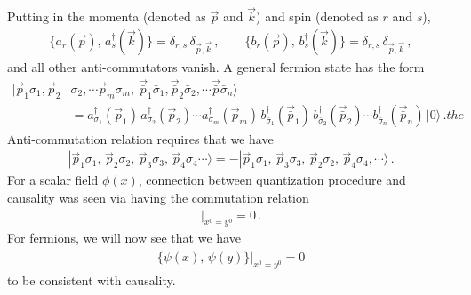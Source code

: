 \documentclass[11pt, onesided]{book}
\theoremstyle{break}
\theoremstyle{break}
\begin{document}
Putting in the momenta (denoted as $\vec{p}$ and $\vec{k}$) and spin (denoted as $r$ and $s$),
\begin{align*}
\{a_r(\vec{p}), \, a_s^\dagger(\vec{k}) \} = \delta_{r,s}\, \delta_{\vec{p},\vec{k}}\,,\qquad
\{b_r(\vec{p}), \, b_s^\dagger(\vec{k}) \} = \delta_{r,s}\, \delta_{\vec{p},\vec{k}}\,,
\end{align*}
and all other anti-commutators vanish. A general fermion state has the form
\begin{align*}
|\vec{p}_1\sigma_1,\vec{p}_2&\sigma_2,\cdots \vec{p}_m \sigma_m,\ \vec{\bar{p}}_1\bar{\sigma}_1,\vec{\bar{p}}_2\bar{\sigma}_2,\cdots \vec{\bar{p}}\bar{\sigma}_n\rangle \\
&= a_{\sigma_1}^\dagger(\vec{p}_1)\,a_{\sigma_2}^\dagger(\vec{p}_2) \cdots a_{\sigma_m}^\dagger(\vec{p}_m) \, b_{\bar{\sigma}_1}^\dagger(\vec{\bar{p}}_1)\,  b_{\bar{\sigma}_2}^\dagger(\vec{\bar{p}}_2)\cdots b_{\bar{\sigma}_n}^\dagger(\vec{\bar{p}}_n)\, |0\rangle\,.the 
\end{align*}
Anti-commutation relation requires that we have
\begin{align*}
|\vec{p}_1\sigma_1,\, \vec{p}_2\sigma_2,\, \vec{p}_3\sigma_3,\, \vec{p}_4\sigma_4 \cdots\rangle = -|\vec{p}_1 \sigma_1,\, \vec{p}_3 \sigma_3,\, \vec{p}_2\sigma_2,\, \vec{p}_4\sigma_4,\cdots\rangle\,.
\end{align*}
For a scalar field $\phi(x)$, connection between quantization procedure and causality was seen via having the commutation relation
\begin{align*}
[\phi(x),\, \phi(y)]|_{x^0 = y^0} = 0\,.
\end{align*}
For fermions, we will now see that we have
\begin{align*}
\{\psi(x),\, \bar{\psi}(y) \}|_{x^0 = y^0} = 0
\end{align*}
to be consistent with causality. \\
\end{document}
